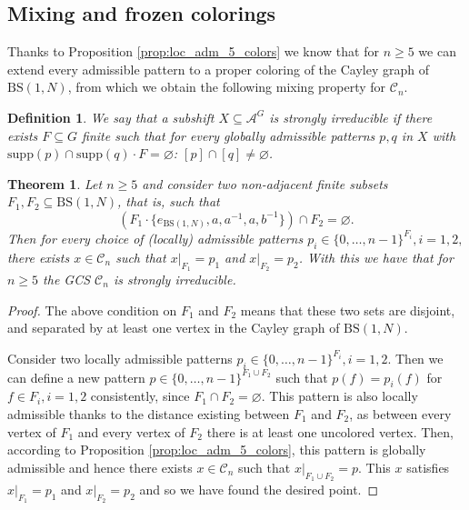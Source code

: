 \documentclass[cupthm,crop,info]{CUP-JNL-ETS}%
\theoremstyle{cupplain}
\newtheorem{theorem}{Theorem}[section]
\theoremstyle{cupdefinition}
\newtheorem{definition}{Definition}[section]
\theoremstyle{cupremark}
\theoremstyle{cupproof}
\newtheorem{proof}{Proof}
\numberwithin{equation}{section}
\newcommand{\BS}[1][N]{\mathrm{BS}(1,#1)}
\begin{document}

\subsection{Mixing and frozen colorings}\label{subsection:mixing_and frozen}
Thanks to Proposition \ref{prop:loc_adm_5_colors} we know that for $n\ge 5$ we can extend every admissible pattern to a proper coloring of the Cayley graph of $\BS$, from which we obtain the following mixing property for $\mathcal{C}_n$.
\begin{definition} We say that a subshift $X\subseteq \mathcal{A}^G$ is \textit{strongly irreducible} if there exists $F\subseteq G$ finite such that for every globally admissible patterns $p,q$ in $X$ with $\mathrm{supp}(p)\cap \mathrm{supp}(q)\cdot F=\varnothing$: $[p]\cap [q]\neq \varnothing$.
\end{definition}

\begin{theorem}\label{thm:gcs_mixing_n5} Let $n\ge 5$ and consider two non-adjacent finite subsets $F_1,F_2\subseteq \BS$, that is, such that 
	$$\left( F_1\cdot \{e_{\BS},a,a^{-1},a,b^{-1}\}\right)\cap F_2=\varnothing.$$
	Then for every choice of (locally) admissible patterns $p_i\in \{0,\ldots,n-1\}^{F_i}, i=1,2,$ there exists $x\in \mathcal{C}_n$ such that $x|_{F_1}=p_1$ and $x|_{F_2}=p_2$. With this we have that for $n\ge 5$ the GCS $\mathcal{C}_n$ is strongly irreducible.
\end{theorem}
\begin{proof}
	The above condition on $F_1$ and $F_2$ means that these two sets are disjoint, and separated by at least one vertex in the Cayley graph of $\BS$. 
	
	Consider two locally admissible patterns $p_i\in \{0,\ldots,n-1\}^{F_i}, i=1,2$. Then we can define a new pattern $p\in \{0,\ldots,n-1\}^{F_1\cup F_2}$ such that $p(f)=p_i(f)$ for $f\in F_i, i=1,2$ consistently, since $F_1\cap F_2=\varnothing.$ This pattern is also locally admissible thanks to the distance existing between $F_1$ and $F_2$, as between every vertex of $F_1$ and every vertex of $F_2$ there is at least one uncolored vertex. Then, according to Proposition \ref{prop:loc_adm_5_colors}, this pattern is globally admissible and hence there exists $x\in \mathcal{C}_n$ such that $x|_{F_1\cup F_2}=p$. This $x$ satisfies $x|_{F_1}=p_1$ and $x|_{F_2}=p_2$ and so we have found the desired point.
\end{proof}
\end{document}
